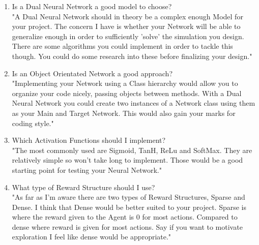 \begin{flushleft}
\begin{enumerate}
                    \item Is a Dual Neural Network a good model to choose? \\
                        \vspace{0.2cm}
                        "A Dual Neural Network should in theory be a complex enough Model for your project. The concern I have is whether your
                        Network will be able to generalize enough in order to sufficiently 'solve' the simulation you design. There are some
                        algorithms you could implement in order to tackle this though. You could do some research into these before finalizing 
                        your design."

                    \item Is an Object Orientated Network a good approach? \\
                        \vspace{0.2cm}
                        "Implementing your Network using a Class hierarchy would allow you to organize your code nicely, passing objects between
                        methods. With a Dual Neural Network you could create two instances of a Network class using them as your Main and Target 
                        Network. This would also gain your marks for coding style."

                    \item Which Activation Functions should I implement? \\
                        \vspace{0.2cm}
                        "The most commonly used are Sigmoid, TanH, ReLu and SoftMax. They are relatively simple so won't take long to implement.
                        Those would be a good starting point for testing your Neural Network."
                    
                    \item What type of Reward Structure should I use? \\
                        \vspace{0.2cm}
                        "As far as I'm aware there are two types of Reward Structures, Sparse and Dense. I think that Dense would be better suited
                        to your project. Sparse is where the reward given to the Agent is 0 for most actions. Compared to dense where reward
                        is given for most actions. Say if you want to motivate exploration I feel like dense would be appropriate."


\end{enumerate}
\end{flushleft}
